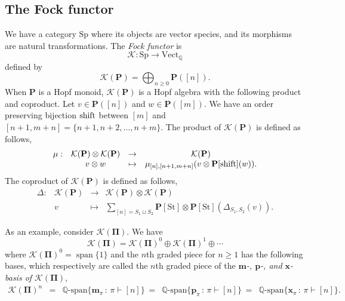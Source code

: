 \documentclass[12pt]{amsart}  %
\theoremstyle{definition}
\theoremstyle{remark}
\numberwithin{equation}{section}
\newcommand{\bbQ}{\mathbb{Q}}
\newcommand{\suchthat}{\,:\,}
\newcommand{\spam}{\operatorname{span}}
\newcommand{\mhm}{\mathbf{m}}           	%
\newcommand{\phm}{\mathbf{p}}                %
\newcommand{\xhm}{\mathbf{x}}
\newcommand{\Vect}{{\mathrm{Vect}}}
\newcommand{\bP}{{\mathbf{P}}}
\newcommand{\bPi}{{\mathbf{\Pi}}}
\newcommand{\calK}{{\mathcal{K}}}
\newcommand{\Sp}{{\mathrm{Sp}}}
\newcommand{\Shift}{{\mathrm{shift}}}
\newcommand{\St}{{\mathrm{St}}}
\begin{document}
\subsection{The Fock functor}
We have a category $\Sp$ where its objects are vector species, and its morphisms are natural transformations. The \emph{Fock functor} is 
$$\calK: \Sp \rightarrow \Vect_\bbQ$$ defined by 
$$\calK(\bP)=\bigoplus_{n\geq 0} \bP([n]).$$
When $\bP$ is a Hopf monoid, $\calK(\bP)$ is a Hopf algebra with the following product and coproduct. Let $v\in \bP([n])$ and $w\in \bP([m])$. We have an order preserving bijection ${\rm shift}$ between $[m]$ and $[n+1,m+n]=\{n+1,n+2,\dots, n+m\}$. 
The product of $\calK(\bP)$ is defined as follows,
\begin{equation}\label{Eq:Pprod}
\begin{array}{cccc}
\mu: & \calK(\bP)\otimes  \calK(\bP)&  \rightarrow & \calK(\bP)\\
& v\otimes w & \mapsto & \mu_{[n],[n+1,m+n]}(v\otimes \bP[{\rm shift}](w)).
\end{array} 
\end{equation} 
  The coproduct of $\calK(\bP)$ is defined as follows,
\begin{equation}\label{Eq:Pcoprod}
\scriptstyle{
\begin{array}{cccc}
\Delta: & \calK(\bP)&  \rightarrow & \calK(\bP)\otimes  \calK(\bP)\\
& v & \mapsto & \sum_{[n]=S_1\sqcup S_2}\bP[\St]\otimes \bP[\St](\Delta_{S_1,S_2}(v)).
\end{array} 
}
\end{equation}

As an example, consider $\calK(\bPi)$. We have 
$$\calK(\bPi)  =\calK(\bPi)^0 \oplus \calK(\bPi)^1 \oplus \cdots$$ where $\calK(\bPi)^0 = \spam \{1\}$ and {the} $n$th graded piece for $n\geq 1$ has the following bases, which respectively are called the $n$th graded piece of the \emph{$\mhm$-, $\phm$-, and $\xhm$-basis of $\calK(\bPi)$},
$$\begin{array}{rclclcc}
\calK(\bPi)^n&=& \mathbb{Q}\text{-span}\{ \mhm_\pi \suchthat \pi\vdash [n]\} &=&\mathbb{Q}\text{-span}\{ \phm_\pi \suchthat \pi\vdash [n]\}
&=& \mathbb{Q}\text{-span}\{ \xhm_\pi \suchthat \pi\vdash [n]\}.
\end{array}$$
\end{document}

